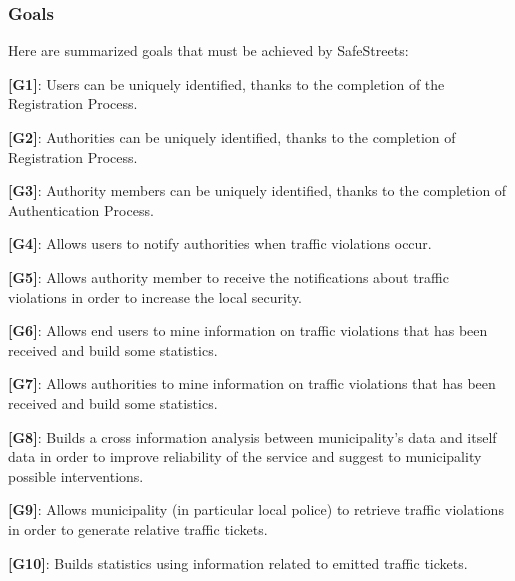 \documentclass[12pt]{article}
\begin{document}
\subsubsection{Goals}
\vspace{5mm}
\begin{flushleft}
Here are summarized goals that must be achieved by SafeStreets:
\vspace{2mm}

\textbf{[G1]}: Users can be uniquely identified, thanks to the completion of the Registration Process.\vspace{1mm}

\textbf{[G2]}: Authorities can be uniquely identified, thanks to the completion of Registration Process.
\vspace{1mm}

\textbf{[G3]}: Authority members can be uniquely identified, thanks to the completion of Authentication Process.
\vspace{1mm}

\textbf{[G4]}: Allows users to notify authorities when traffic violations occur.
\vspace{1mm}

\textbf{[G5]}: Allows authority member to receive the notifications about traffic violations in order to increase the local security.
\vspace{1mm}

\textbf{[G6]}: Allows end users to mine information on traffic violations that has been received and build some statistics.
\vspace{1mm}

\textbf{[G7]}: Allows authorities to mine information on traffic violations that has been received and build some statistics.\vspace{1mm}

\textbf{[G8]}: Builds a cross information analysis between municipality’s data and itself data in order to improve reliability of the service and suggest to municipality possible interventions. \vspace{1mm}

\textbf{[G9]}: Allows municipality (in particular local police) to retrieve traffic violations in order to generate relative traffic tickets.\vspace{1mm}

\textbf{[G10]}: Builds statistics using information related to emitted traffic tickets.
\end{flushleft}
\vspace{5mm}
\end{document}
